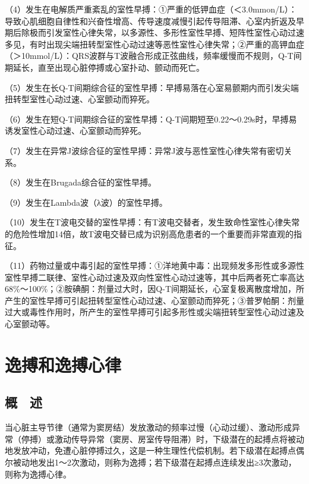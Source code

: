 （4）发生在电解质严重紊乱的室性早搏：①严重的低钾血症（＜3.0mmon/L）：导致心肌细胞自律性和兴奋性增高、传导速度减慢引起传导阻滞、心室内折返及早期后除极而引发室性心律失常，以多源性、多形性室性早搏、短阵性室性心动过速多见，有时出现尖端扭转型室性心动过速等恶性室性心律失常；②严重的高钾血症（＞10mmol/L）：QRS波群与T波融合形成正弦曲线，频率缓慢而不规则，Q-T间期延长，直至出现心脏停搏或心室扑动、颤动而死亡。

（5）发生在长Q-T间期综合征的室性早搏：早搏易落在心室易颤期内而引发尖端扭转型室性心动过速、心室颤动而猝死。

（6）发生在短Q-T间期综合征的室性早搏：Q-T间期短至0.22～0.29s时，早搏易诱发室性心动过速、心室颤动而猝死。

（7）发生在异常J波综合征的室性早搏：异常J波与恶性室性心律失常有密切关系。

（8）发生在Brugada综合征的室性早搏。

（9）发生在Lambda波（λ波）的室性早搏。

（10）发生在T波电交替的室性早搏：有T波电交替者，发生致命性室性心律失常的危险性增加14倍，故T波电交替已成为识别高危患者的一个重要而非常直观的指征。

（11）药物过量或中毒引起的室性早搏：①洋地黄中毒：出现频发多形性或多源性室性早搏二联律、室性心动过速及双向性室性心动过速等，其中后两者死亡率高达68\%～100\%；②胺碘酮：剂量过大时，因Q-T间期延长，心室复极离散度增加，所产生的室性早搏可引起扭转型室性心动过速、心室颤动而猝死；③普罗帕酮：剂量过大或毒性作用时，所产生的室性早搏可引起多形性或尖端扭转型室性心动过速及心室颤动等。

\protect\hypertarget{text00019.html}{}{}

\protect\hypertarget{text00019.htmlux5cux23chapter19}{}{}

\chapter{逸搏和逸搏心律}

\protect\hypertarget{text00019.htmlux5cux23subid169}{}{}

\section{概　述}

当心脏主导节律（通常为窦房结）发放激动的频率过慢（心动过缓）、激动形成异常（停搏）或激动传导异常（窦房、房室传导阻滞）时，下级潜在的起搏点将被动地发放冲动，免遭心脏停搏过久，这是一种生理性代偿机制。若下级潜在起搏点偶尔被动地发出1～2次激动，则称为逸搏；若下级潜在起搏点连续发出≥3次激动，则称为逸搏心律。

